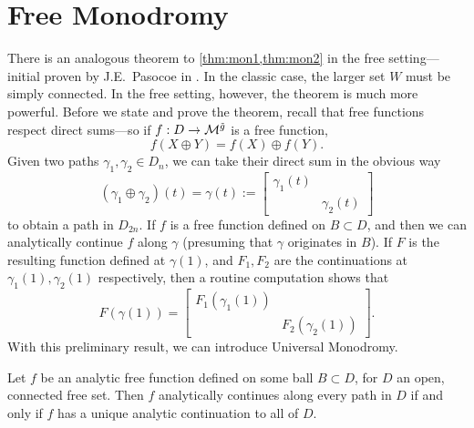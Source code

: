 \section{Free Monodromy}%
\label{sec:freemono}

There is an analogous theorem to \cref{thm:mon1,thm:mon2} in the free setting---
initial proven by J.E.\ Pasocoe in \cite{pascoeNoncommutative2020}.
In the classic case, the larger set \(W\) must be simply connected. In the free
setting, however, the theorem is much more powerful. Before we state and prove
the theorem, recall that free functions respect direct sums---so if
\(f: D\to \mathcal{M}^{\tilde{g}} \) is a free function,
\[
  f(X \oplus Y ) = f(X) \oplus f(Y).
\]
Given two paths \(\gamma_1, \gamma_2 \in D_n\), we can take their direct sum in
the obvious way
\[
  (\gamma_1\oplus\gamma_2 )(t) = \gamma(t) := \begin{bmatrix} \gamma_1(t) & \\& \gamma_2(t) \end{bmatrix}
\]
to obtain a path in \(D_{2n}\). If \(f\) is a free function defined on
\(B \subset D\), and then we can analytically continue \(f\) along \(\gamma\)
(presuming that \(\gamma\) originates in \(B\)). If \(F\) is the resulting
function defined at \(\gamma(1)\), and \(F_1,F_2\) are the continuations at
\(\gamma_1(1), \gamma_2(1)\) respectively, then a routine computation shows that
\[
  F(\gamma(1)) = \begin{bmatrix} F_1(\gamma_1(1)) & \\& F_2(\gamma_2(1))\end{bmatrix} .
\]
With this preliminary result, we can introduce Universal Monodromy.
\begin{theorem}%
  \label{thm:freemono}
  Let \(f\) be an analytic free function defined on some ball \(B \subset D\),
  for \(D\) an open, connected free set.
  Then \(f\) analytically continues along every path in \(D\) if and only if
  \(f\) has a unique analytic continuation to all of \(D\).
\end{theorem}

